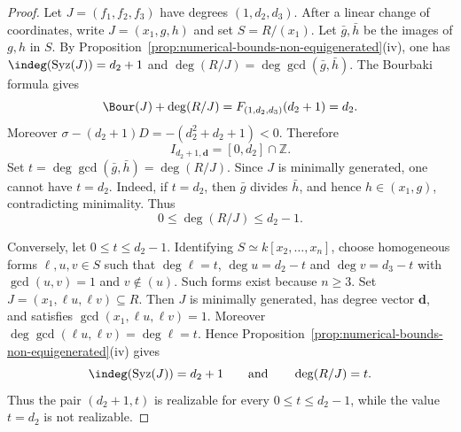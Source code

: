 \documentclass[11pt]{amsart} %
\theoremstyle{definition}
\def\syz{\mbox{\rm Syz}}
\begin{document}
\begin{proof}
Let $J=(f_1,f_2,f_3)$ have degrees $(1,d_2,d_3)$. After a linear change of
coordinates, write $J=(x_1,g,h)$ and set $S=R/(x_1)$. Let $\bar g,\bar h$ be
the images of $g,h$ in $S$. By
Proposition~\ref{prop:numerical-bounds-non-equigenerated}{\rm(iv)}, one has$
\indeg(\syz(J))=d_2+1$ and $\deg(R/J)=\deg\gcd(\bar g,\bar h)$. 
The Bourbaki formula gives
\[
\Bour(J)+\deg(R/J)
=F_{(1,d_2,d_3)}(d_2+1)=d_2.
\]
Moreover $\sigma-(d_2+1)D=-(d_2^2+d_2+1)<0$. Therefore
\[
I_{d_2+1,\mathbf d}=[0,d_2]\cap\mathbb Z.
\]
Set $t=\deg\gcd(\bar g,\bar h)=\deg(R/J)$. Since $J$ is minimally generated, one cannot have $t=d_2$. Indeed, if $t=d_2$, then $\bar g$ divides $\bar h$, and hence
$h\in(x_1,g)$, contradicting minimality. Thus
\[
0\le\deg(R/J)\le d_2-1.
\]

Conversely, let $0\le t\le d_2-1$. Identifying
$S\simeq k[x_2,\ldots,x_n]$, choose homogeneous forms $\ell,u,v\in S$ such
that $\deg\ell=t$, $\deg u=d_2-t$ and $\deg v=d_3-t$ with $\gcd(u,v)=1$ and $v\notin(u)$. Such forms exist because $n\ge3$. Set $J=(x_1,\ell u,\ell v)\subseteq R$. Then $J$ is minimally generated, has degree vector $\mathbf d$, and satisfies
$\gcd(x_1,\ell u,\ell v)=1$.
Moreover $\deg\gcd(\ell u,\ell v)=\deg\ell=t$. Hence Proposition~\ref{prop:numerical-bounds-non-equigenerated}{\rm(iv)}
gives
\[
\indeg(\syz(J))=d_2+1
\qquad\text{and}\qquad
\deg(R/J)=t.
\]
Thus the pair $(d_2+1,t)$ is realizable for every
$0\le t\le d_2-1$, while the value $t=d_2$ is not realizable.
\end{proof}
\end{document}
